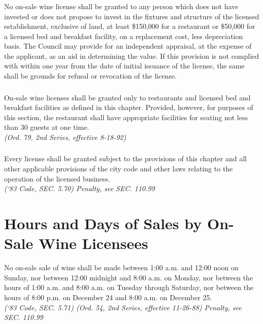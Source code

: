 \subsubsection{}
No on-sale wine license shall be granted to any person which does not have invested or does not propose to invest in the fixtures and structure of the licensed establishment, exclusive of land, at least \$150,000 for a restaurant or \$50,000 for a licensed bed and breakfast facility, on a replacement cost, less depreciation basis.  The Council may provide for an independent appraisal, at the expense of the applicant, as an aid in determining the value.  If this provision is not complied with within one year from the date of initial issuance of the license, the same shall be grounds for refusal or revocation of the license.
\subsubsection{}
On-sale wine licenses shall be granted only to restaurants and licensed bed and breakfast facilities as defined in this chapter.  Provided, however, for purposes of this section, the restaurant shall have appropriate facilities for seating not less than 30 guests at one time.\\
\emph{(Ord. 79, 2nd Series, effective 8-18-92)}
\subsubsection{}
Every license shall be granted subject to the provisions of this chapter and all other applicable provisions of the city code and other laws relating to the operation of the licensed business.\\
\emph{(‘83 Code, SEC. 5.70)  Penalty, see SEC. 110.99}
\section{Hours and Days of Sales by On-Sale Wine Licensees}
No on-sale sale of wine shall be made between 1:00 a.m. and 12:00 noon on Sunday, nor between 12:00 midnight and 8:00 a.m. on Monday, nor between the hours of 1:00 a.m. and 8:00 a.m. on Tuesday through Saturday, nor between the hours of 8:00 p.m. on December 24 and 8:00 a.m. on December 25.\\
\emph{(‘83 Code, SEC. 5.71)  (Ord. 54, 2nd Series, effective 11-26-88)  Penalty, see SEC. 110.99}
